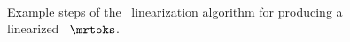 \begin{figure}[p]
{\begin{minipage}{\textwidth}
{\begin{tikzpicture}
    \end{tikzpicture}
    }
    ~\\
    \caption{Example steps of the \alignmenttraining~linearization algorithm
        for producing a linearized \meaningrepresentation~$\mrtoks$.}
        \label{fig:at}
\end{minipage}}
\end{figure}


